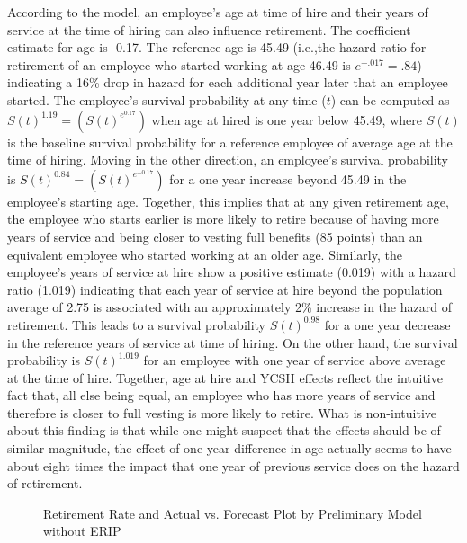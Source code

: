 According to the model, an employee's age at time of hire and their years of service at the time of hiring can also influence retirement. The coefficient estimate for age is -0.17. The reference age is 45.49 (i.e.,the hazard ratio for retirement of an employee who started working at age 46.49 is $e^{-.017}=.84$) indicating a 16\% drop in hazard for each additional year later that an employee started. The employee's survival probability at any time ($t$) can be computed as $S(t)^{1.19} = (S(t)^{e^{0.17}})$ when age at hired is one year below 45.49,  where $S(t)$ is the baseline survival probability for a reference employee of average age at the time of hiring. Moving in the other direction, an employee's survival probability is $S(t)^{0.84}=(S(t)^{e^{-0.17}})$ for a one year increase beyond 45.49 in the employee's starting age. Together, this implies that at any given retirement age, the employee who starts earlier is more likely to retire because of having more years of service and being closer to vesting full benefits (85 points) than an equivalent employee who started working at an older age. Similarly, the employee's years of service at hire show a positive estimate (0.019) with a hazard ratio (1.019) indicating that each year of service at hire beyond the population average of 2.75 is associated with an approximately 2\% increase in the hazard of retirement.  This leads to a survival probability $S(t)^{0.98}$ for a one year decrease in the reference years of service at time of hiring. On the other hand, the survival probability is $S(t)^{1.019}$ for an employee with one year of service above average at the time of hire. Together, age at hire and YCSH effects reflect the intuitive fact that, all else being equal, an employee who has more years of service and therefore is closer to full vesting is more likely to retire.  What is non-intuitive about this finding is that while one might suspect that the effects should be of similar magnitude, the effect of one year difference in age actually seems to have about eight times the impact that one year of previous service does on the hazard of retirement.

\begin{figure}[h!]
	\centering
	\caption{Retirement Rate and Actual vs. Forecast Plot by Preliminary Model without ERIP}
	\label{fig:rerate}
\end{figure}


